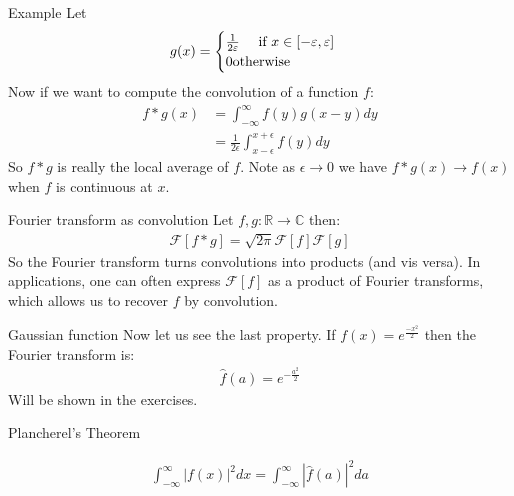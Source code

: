 \begin{parag}{Example}
    Let 
	\begin{align*} 
		g\left(x\right) = \begin{cases}
			\frac{1}{2 \epsilon} \mathspace \text{ if } x \in \left[-\epsilon, \epsilon\right]\\ 0 \text{otherwise}
		\end{cases}
	\end{align*}
	Now if we want to compute the convolution of a function $f$:
	\begin{align*} 
		f \ast g \left(x\right) &=  \int_{-\infty}^{\infty} f\left(y\right) g\left(x - y\right) dy \\
		&= \frac{1}{2\epsilon}\int_{x - \epsilon}^{x + \epsilon} f\left(y\right)dy
	\end{align*}
	So $f \ast g$ is really the local average of $f$. Note as $\epsilon \to 0$ we have $f \ast g \left(x\right) \to f\left(x\right)$ when $f$ is continuous at $x$. 
\end{parag}




\begin{parag}{Fourier transform as convolution}
    Let $f , g: \mathbb{R} \to \mathbb{C}$ then:
	\begin{align*} 
		\mathcal{F} \left[f \ast g\right] = \sqrt{2\pi} \mathcal{F}\left[f\right] \mathcal{F}\left[g\right]
	\end{align*}
	So the Fourier transform turns convolutions into products (and vis versa). In applications, one can often express $\mathcal{F}\left[f\right]$ as a product of Fourier transforms, which allows us to recover $f$ by convolution.
\end{parag}
\begin{parag}{Gaussian function}
    Now let us see the last property. If $f\left(x\right) = e^{\frac{-x^2}{2}}$ then the Fourier transform is:
	\begin{align*} 
		\hat{f}\left(a\right) =  e^{-\frac{a^2}{2}}
	\end{align*}
	Will be shown in the exercises.
\end{parag}

\begin{parag}{Plancherel's Theorem}
    \begin{theoreme}
    \begin{align*}
		\int_{-\infty}^{\infty} \left|f\left(x\right)\right|^2 dx =  \int_{-\infty}^{\infty} \left|\hat{f}\left(a\right)\right|^2 da
	\end{align*}
    \end{theoreme}
\end{parag}


